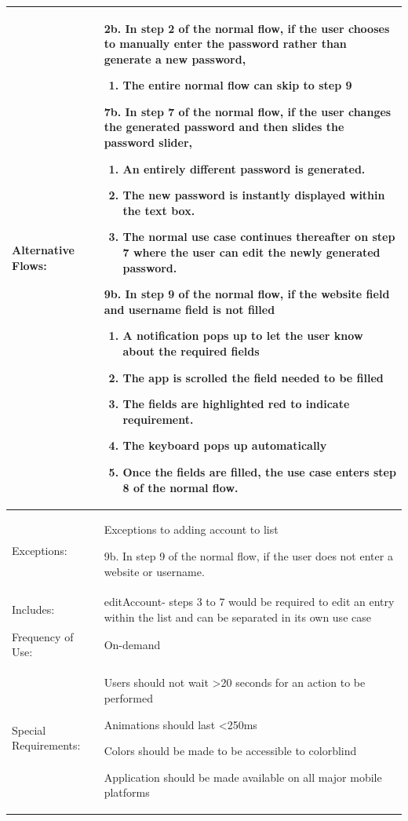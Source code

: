 \documentclass[stu]{apa7}
\newcommand{\nextitem}{\par\hspace*{\labelsep}\textbullet\hspace*{\labelsep}}
\newcommand{\nextitemblank}{\par\hspace*{\labelsep}\hspace*{\labelsep}}
\begin{document}
{\begin{xltabular}{\textwidth}{|l|X|}
 Alternative Flows: & \nextitemblank 2b. In step 2 of the normal flow, if the user chooses to manually enter the password rather than generate a new password,
   \begin{enumerate}
     \item The entire normal flow can skip to step 9
   \end{enumerate}
   \nextitemblank 7b. In step 7 of the normal flow, if the user changes the generated password and then slides the password slider,
   \begin{enumerate}
     \item An entirely different password is generated.
     \item The new password is instantly displayed within the text box.
     \item The normal use case continues thereafter on step 7 where the user can edit the newly generated password.
   \end{enumerate}
   \nextitemblank 9b. In step 9 of the normal flow, if the website field and username field is not filled
     \begin{enumerate}
     \item A notification pops up to let the user know about the required fields
     \item The app is scrolled the field needed to be filled
     \item The fields are highlighted red to indicate requirement. 
     \item The keyboard pops up automatically
     \item Once the fields are filled, the use case enters step 8 of the normal flow.
     \end{enumerate} \\ \hline

   Exceptions: & Exceptions to adding account to list
     \nextitemblank 9b. In step 9 of the normal flow, if the user does not enter a website or username. \\ \hline

   Includes: & editAccount- steps 3 to 7 would be required to edit an entry within the list and can be separated in its own use case \\ \hline

   Frequency of Use: & On-demand\\ \hline

   Special Requirements: & \nextitem Users should not wait >20 seconds for an action to be performed
     \nextitem Animations should last <250ms
     \nextitem Colors should be made to be accessible to colorblind
     \nextitem Application should be made available on all major mobile platforms \\ \hline



\end{xltabular}}
\end{document}
